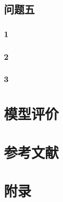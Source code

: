 \documentclass[UTF8]{ctexart}
\begin{document}
	\subsection{问题五}
	\subsubsection{1}
	\subsubsection{2}
	\subsubsection{3}
	
	\section{模型评价}
	
	
	\section{参考文献}
	
	\section{附录}
	\begin{appendices}
		
	\end{appendices}
	
\end{document}
